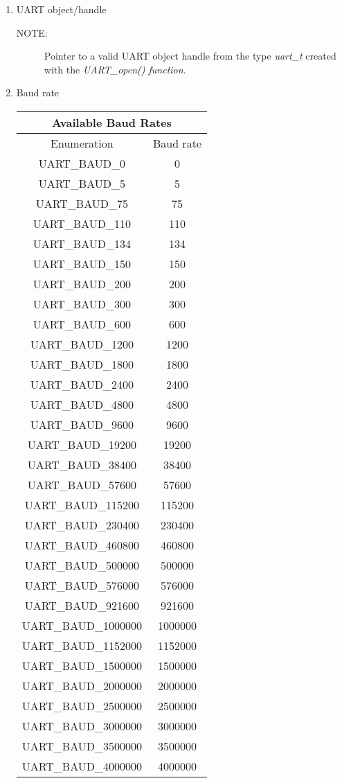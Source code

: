 \documentclass{report}
\begin{document}
\begin{enumerate}
\item UART object/handle
\begin{description}
\item[NOTE:] Pointer to a valid UART object handle from the type \textit{uart\_t}
created with the \textit{UART\_open() function}.
\end{description}
\item Baud rate
\newline
\newline
\begin{tabular}{| c | c |}
\hline
\multicolumn{2}{|c|}{Available Baud Rates} \\
\hline
Enumeration & Baud rate \\
\hline
UART\_BAUD\_0 & 0 \\
UART\_BAUD\_5 & 5 \\
UART\_BAUD\_75 & 75 \\
UART\_BAUD\_110 & 110 \\
UART\_BAUD\_134 & 134 \\
UART\_BAUD\_150 & 150 \\
UART\_BAUD\_200 & 200 \\
UART\_BAUD\_300 & 300 \\
UART\_BAUD\_600 & 600 \\
UART\_BAUD\_1200 & 1200 \\
UART\_BAUD\_1800 & 1800 \\
UART\_BAUD\_2400 & 2400 \\
UART\_BAUD\_4800 & 4800 \\
UART\_BAUD\_9600 & 9600 \\
UART\_BAUD\_19200 & 19200 \\
UART\_BAUD\_38400 & 38400 \\
UART\_BAUD\_57600 & 57600 \\
UART\_BAUD\_115200 & 115200 \\
UART\_BAUD\_230400 & 230400 \\
UART\_BAUD\_460800 & 460800 \\
UART\_BAUD\_500000 & 500000 \\
UART\_BAUD\_576000 & 576000 \\
UART\_BAUD\_921600 & 921600 \\
UART\_BAUD\_1000000 & 1000000 \\
UART\_BAUD\_1152000 & 1152000 \\
UART\_BAUD\_1500000 & 1500000 \\
UART\_BAUD\_2000000 & 2000000 \\
UART\_BAUD\_2500000 & 2500000 \\
UART\_BAUD\_3000000 & 3000000 \\
UART\_BAUD\_3500000 & 3500000 \\
UART\_BAUD\_4000000 & 4000000 \\
\hline
\end{tabular}
\end{enumerate}
\end{document}

